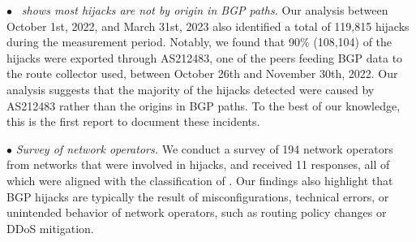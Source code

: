 {  $\bullet$ {\em \lov\ shows most hijacks are not by origin in BGP paths.} Our analysis between October 1st, 2022, and March 31st, 2023 also identified a total of 119,815 hijacks during the measurement period. Notably, we found that 90\% (108,104) of the hijacks were exported through AS212483, one of the peers feeding BGP data to the route collector used, between October 26th and November 30th, 2022. Our analysis suggests that the majority of the hijacks detected were caused by AS212483 rather than the origins in BGP paths. To the best of our knowledge, this is the first report to document these incidents. 

$\bullet$ {\em Survey of network operators.} We conduct a survey of 194 network operators from networks that were involved in hijacks, and received 11 responses, all of which were aligned with the classification of \lov. Our findings also highlight that BGP hijacks are typically the result of misconfigurations, technical errors, or unintended behavior of network operators, such as routing policy changes or DDoS mitigation. %
}



